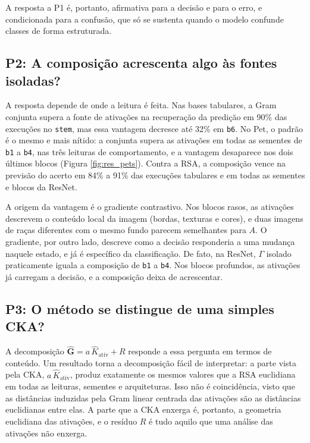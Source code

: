 A resposta a P1 é, portanto, afirmativa para a decisão e para o erro, e condicionada para a confusão, que só se sustenta quando o modelo confunde classes de forma estruturada.

\subsection{P2: A composição acrescenta algo às fontes isoladas?}\label{subsec:res_composicao}

A resposta depende de onde a leitura é feita. Nas bases tabulares, a Gram conjunta supera a fonte de ativações na recuperação da predição em 90\% das execuções no \texttt{stem}, mas essa vantagem decresce até 32\% em \texttt{b6}. No Pet, o padrão é o mesmo e mais nítido: a conjunta supera as ativações em todas as sementes de \texttt{b1} a \texttt{b4}, nas três leituras de comportamento, e a vantagem desaparece nos dois últimos blocos (Figura \ref{fig:res_pets}). Contra a RSA, a composição vence na previsão do acerto em 84\% a 91\% das execuções tabulares e em todas as sementes e blocos da ResNet.

A origem da vantagem é o gradiente contrastivo. Nos blocos rasos, as ativações descrevem o conteúdo local da imagem (bordas, texturas e cores), e duas imagens de raças diferentes com o mesmo fundo parecem semelhantes para $A$. O gradiente, por outro lado, descreve como a decisão responderia a uma mudança naquele estado, e já é específico da classificação. De fato, na ResNet, $\Gamma$ isolado praticamente iguala a composição de \texttt{b1} a \texttt{b4}. Nos blocos profundos, as ativações já carregam a decisão, e a composição deixa de acrescentar.

\subsection{P3: O método se distingue de uma simples CKA?}\label{subsec:res_cka}

A decomposição $\hat{\mathbf{G}} = a\,\hat{K}_{\mathrm{ativ}} + R$ responde a essa pergunta em termos de conteúdo. Um resultado torna a decomposição fácil de interpretar: a parte vista pela CKA, $a\,\hat{K}_{\mathrm{ativ}}$, produz exatamente os mesmos valores que a RSA euclidiana em todas as leituras, sementes e arquiteturas. Isso não é coincidência, visto que as distâncias induzidas pela Gram linear centrada das ativações são as distâncias euclidianas entre elas. A parte que a CKA enxerga é, portanto, a geometria euclidiana das ativações, e o resíduo $R$ é tudo aquilo que uma análise das ativações não enxerga.

